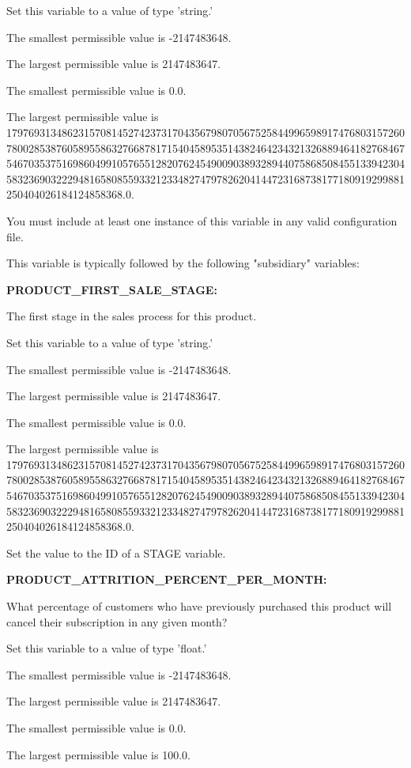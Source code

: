 Set this variable to a value of type 'string.'

The smallest permissible value is -2147483648.

The largest permissible value is 2147483647.

The smallest permissible value is 0.0.

The largest permissible value is 179769313486231570814527423731704356798070567525844996598917476803157260780028538760589558632766878171540458953514382464234321326889464182768467546703537516986049910576551282076245490090389328944075868508455133942304583236903222948165808559332123348274797826204144723168738177180919299881250404026184124858368.0.

You must include at least one instance of this variable in any valid configuration file.

This variable is typically followed by the following "subsidiary" variables:


\textbf{PRODUCT\_FIRST\_SALE\_STAGE:}


The first stage in the sales process for this product.

Set this variable to a value of type 'string.'

The smallest permissible value is -2147483648.

The largest permissible value is 2147483647.

The smallest permissible value is 0.0.

The largest permissible value is 179769313486231570814527423731704356798070567525844996598917476803157260780028538760589558632766878171540458953514382464234321326889464182768467546703537516986049910576551282076245490090389328944075868508455133942304583236903222948165808559332123348274797826204144723168738177180919299881250404026184124858368.0.

Set the value to the ID of a STAGE variable.


\textbf{PRODUCT\_ATTRITION\_PERCENT\_PER\_MONTH:}


What percentage of customers who have previously purchased this product will cancel their subscription in any given month?

Set this variable to a value of type 'float.'

The smallest permissible value is -2147483648.

The largest permissible value is 2147483647.

The smallest permissible value is 0.0.

The largest permissible value is 100.0.


